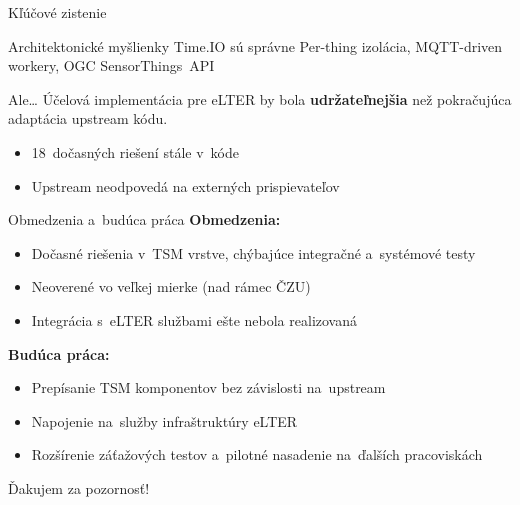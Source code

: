\documentclass[]{beamer}
\begin{document}
\begin{frame}{Kľúčové zistenie}
\begin{block}{Architektonické myšlienky Time.IO sú správne}
  Per-thing izolácia, MQTT-driven workery, OGC SensorThings~API
\end{block}
\vspace{0.5em}
\begin{alertblock}{Ale\ldots}
  Účelová implementácia pre eLTER by bola \textbf{udržateľnejšia}
  než pokračujúca adaptácia upstream kódu.
\end{alertblock}
\vspace{0.5em}
\begin{itemize}
  \item 18~dočasných riešení stále v~kóde
  \item Upstream neodpovedá na externých prispievateľov
\end{itemize}
\end{frame}

\begin{frame}{Obmedzenia a~budúca práca}
\textbf{Obmedzenia:}
\begin{itemize}
  \item Dočasné riešenia v~TSM vrstve, chýbajúce integračné a~systémové testy
  \item Neoverené vo veľkej mierke (nad rámec ČZU)
  \item Integrácia s~eLTER službami ešte nebola realizovaná
\end{itemize}
\vspace{0.5em}
\textbf{Budúca práca:}
\begin{itemize}
  \item Prepísanie TSM komponentov bez závislosti na~upstream
  \item Napojenie na~služby infraštruktúry eLTER
  \item Rozšírenie záťažových testov a~pilotné nasadenie na~ďalších pracoviskách
\end{itemize}
\end{frame}

\appendix


\begin{frame}[plain]
\vfill
\centerline{\Large Ďakujem za pozornosť!}
\vfill\vfill
\end{frame}
\end{document}
